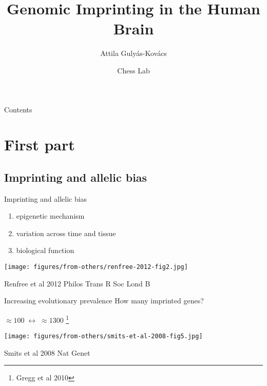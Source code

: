 \documentclass{beamer}
\title{Genomic Imprinting in the Human Brain}
\author{Attila Guly\'{a}s-Kov\'{a}cs}
\date{Chess Lab}
\begin{document}
\begin{frame}[plain, label=title]
\maketitle
\end{frame}

\begin{frame}{Contents}
\tableofcontents
\end{frame}

\section{First part}

\subsection{Imprinting and allelic bias}

\begin{frame}{Imprinting and allelic bias}
\begin{enumerate}
\item epigenetic mechanism
\item variation across time and tissue
\item biological function 
\end{enumerate}
\texttt{[image: figures/from-others/renfree-2012-fig2.jpg]}

{\tiny Renfree et al 2012 Philos Trans R Soc Lond B}

\end{frame}

\begin{frame}{Increasing evolutionary prevalence}{}
How many imprinted genes?

\(\approx 100 \; \leftrightarrow \; \approx 1300\) \footnote{Gregg et al 2010}

\texttt{[image: figures/from-others/smits-et-al-2008-fig5.jpg]}

{\tiny Smits et al 2008 Nat Genet}
\end{frame}
\end{document}
